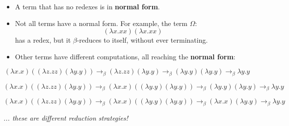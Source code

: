 \documentclass{article}
\begin{document}
\begin{itemize}
    \item A term that has no redexes is in \textbf{normal form}.
    \item Not all terms have a normal form. For example, the term $\Omega$:
    \[
    (\lambda x.xx)(\lambda x.xx)
    \]
    has a redex, but it $\beta$-reduces to itself, without ever terminating.
    \item Other terms have different computations, all reaching the \textbf{normal form}:
\end{itemize}

\[
(\lambda x.x)((\lambda z.zz)(\lambda y.y)) \to_\beta (\lambda z.zz)(\lambda y.y) \to_\beta (\lambda y.y)(\lambda y.y) \to_\beta \lambda y.y
\]

\[
(\lambda x.x)((\lambda z.zz)(\lambda y.y)) \to_\beta (\lambda x.x)((\lambda y.y)(\lambda y.y)) \to_\beta (\lambda y.y)(\lambda y.y) \to_\beta \lambda y.y
\]

\[
(\lambda x.x)((\lambda z.zz)(\lambda y.y)) \to_\beta (\lambda x.x)((\lambda y.y)(\lambda y.y)) \to_\beta (\lambda x.x)(\lambda y.y) \to_\beta \lambda y.y
\]

\textit{... these are different reduction strategies!}
\end{document}
